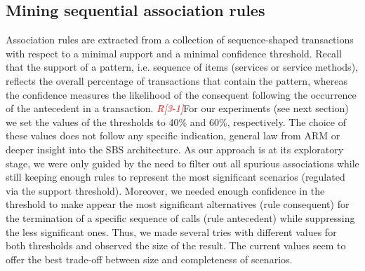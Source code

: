 
\subsection*{Mining sequential association rules \label{details-assoc} \protect \\
}

Association rules are extracted from
a collection of sequence-shaped transactions 
with respect to a minimal support and a minimal confidence threshold.
Recall that the support of a pattern, i.e. sequence of items (services or service methods),
reflects the overall percentage of transactions that contain the pattern,
whereas the confidence measures the likelihood of the consequent following
the occurrence of the antecedent in a transaction.
\textcolor{red}{\emph{R[3-1]}}For our experiments (see next section) we set the values of
the thresholds to  40\% and 60\%, respectively. 
The choice of these values does not follow any
specific indication, general law from ARM or deeper insight
into the SBS architecture.
As our approach is at its exploratory stage,
we were only guided by the need to filter out all spurious
associations while still keeping enough rules to represent the
most significant scenarios (regulated via the support threshold).
Moreover, we needed enough confidence in the threshold to make appear
the most significant alternatives (rule consequent) for the termination of
a specific sequence of calls (rule antecedent) while suppressing the
less significant ones.
Thus, we made several tries with different values for both thresholds
and observed the size of the result. The current values seem to offer the
best trade-off between size and completeness of scenarios.


